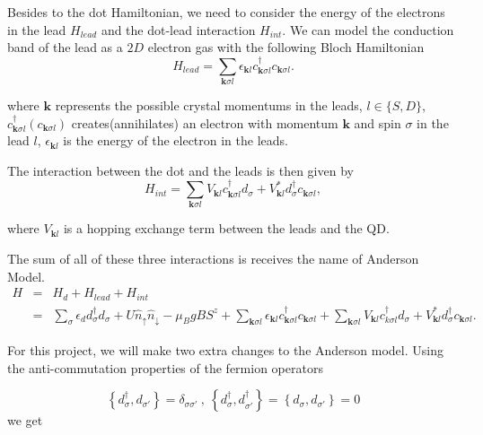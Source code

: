 Besides to the dot Hamiltonian, we need to consider the energy of the electrons in the lead $H_{lead}$ and the dot-lead interaction $H_{int}$. We can model  the conduction band of the lead as a $2D$ electron gas with the following Bloch Hamiltonian
\begin{equation}
H_{lead}  =  \sum_{\mathbf{k}\sigma l}\epsilon_{\mathbf{k}l}c_{\mathbf{k}\sigma l}^{\dagger}c_{\mathbf{k}\sigma l}. 
\end{equation}

where $\mathbf{k}$ represents the possible crystal momentums in the
leads, $l\in\{S,D\}$, $c_{\mathbf{k}\sigma l}^{\dagger}(c_{\mathbf{k}\sigma l})$
creates(annihilates) an electron with momentum $\mathbf{k}$ and spin
$\sigma$ in the lead $l$, $\epsilon_{\mathbf{k}l}$ is the energy
of the electron in the leads. 

The interaction between the dot and the leads is then given by 
\begin{equation}
H_{int} = \sum_{\mathbf{k}\sigma l}V_{\mathbf{k}l}c_{\mathbf{k}\sigma l}^{\dagger}d_{\sigma}+V_{\mathbf{k}l}^{*}d_{\sigma}^{\dagger}c_{\mathbf{k}\sigma l},
\end{equation}


where $V_{\mathbf{k}l}$ is a hopping exchange
term between the leads and the QD. 


The sum of all of these three interactions is receives the name of Anderson Model. 
\begin{eqnarray}
H & = & H_{d}+H_{lead}+H_{int}\nonumber \\
 & = & \sum_{\sigma}\epsilon_{d}d_{\sigma}^{\dagger}d_{\sigma}+U\hat{n}_{\uparrow}\hat{n}_{\downarrow}-\mu_{B}gBS^{z}+\sum_{\mathbf{k}\sigma l}\epsilon_{\mathbf{k}l}c_{\mathbf{k}\sigma l}^{\dagger}c_{\mathbf{k}\sigma l}+\sum_{\mathbf{k}\sigma l}V_{\mathbf{k}l}c_{k\sigma l}^{\dagger}d_{\sigma}+V_{\mathbf{k}l}^{*}d_{\sigma}^{\dagger}c_{\mathbf{k}\sigma l}.\label{eq:Anderson}
\end{eqnarray}

For this project, we will make two extra changes to the Anderson model. Using the anti-commutation properties of the fermion operators

\[
\left\{ d_{\sigma}^{\dagger},d_{\sigma'}\right\} =\delta_{\sigma\sigma'}\ ,\ \left\{ d_{\sigma}^{\dagger},d_{\sigma'}^{\dagger}\right\} =\left\{ d_{\sigma},d_{\sigma'}\right\} =0
\]
we get


